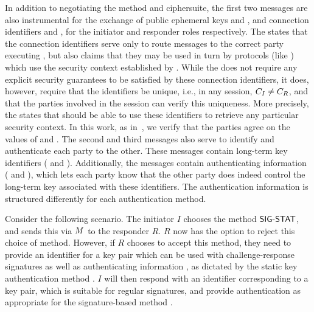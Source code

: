 \documentclass[runningheads]{llncs}
\begin{document}
In addition to negotiating the method and ciphersuite, the first two messages are
also instrumental for the exchange of public ephemeral keys \mGx{} and
\mGy{},
and connection identifiers \mCi{} and \mCr{}, for the initiator and responder
roles respectively.
%
The \mSpec{} states that the connection identifiers serve only to route
messages
to the correct party executing \mEdhoc{}, but also claims that they may be
used in turn by protocols (like \mOscore{}) which use the security context
established by \mEdhoc{}.
%
While the \mSpec{} does not require any explicit security guarantees to be
satisfied by these connection identifiers, it does, however, require that the
identifiers be unique, i.e., in any session, $C_I{} \neq C_R{}$, and that the
parties involved in the session can verify this uniqueness.
%
More precisely, the \mSpec{} states that \mOscore{} should be able to use these
identifiers to retrieve any particular security context.
%
In this work, as in~\cite{Norr21}, we verify that the parties agree on the
values of \mCi{} and \mCr{}.
%
The second and third messages also serve to identify and authenticate each
party to the other.
%
These messages contain long-term key identifiers (\mIdcredi{} and
\mIdcredr{}).
%
Additionally, the messages contain authenticating information
(\mAuthi{} and \mAuthr{}), which lets each
party know that the other party does indeed control the long-term key
associated with these identifiers.
%
The authentication information is structured differently for each authentication method.
%

Consider the following scenario.
%
The initiator $I$ chooses the method $\textsf{SIG-STAT}{}$, and sends this via
$M{}$ to the responder $R$.
%
$R$ now has the option to reject this choice of method.
%
However, if $R$ chooses to accept this method, they need to provide an
identifier \mIdcredr{} for a key pair which can be used with
challenge-response
signatures
as well as authenticating information \mAuthr{}, as dictated by
the static key authentication method \mStat{}.
%
$I$ will then respond with an identifier \mIdcredi{} corresponding to a key
pair, which is suitable for regular signatures, and provide authentication
\mAuthi{} as appropriate for the signature-based method \mSig{}.

\end{document}
